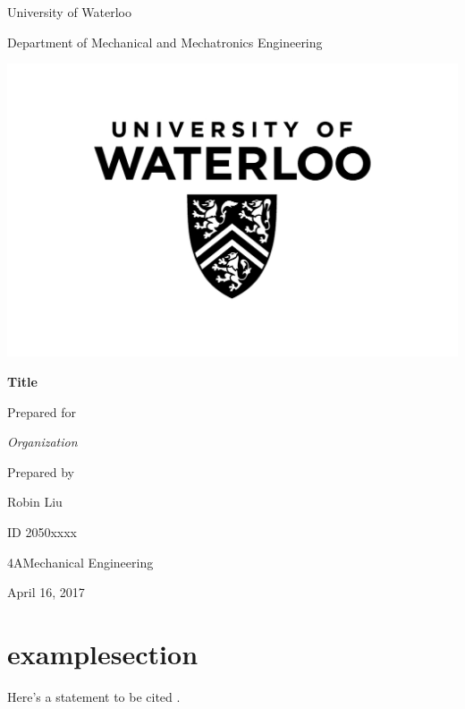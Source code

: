 \documentclass[12pt,letterpaper]{article}
\newcommand{\dateofsubmittal}{April 16, 2017}
\newcommand{\department}{Department of Mechanical and Mechatronics Engineering}
\newcommand{\yourname}{Robin Liu}
\newcommand{\youridnumber}{2050xxxx}
\newcommand{\academicterm}{4A}
\newcommand{\yourdiscipline}{Mechanical Engineering}
\begin{document}
  \begin{titlepage}
    \vspace*{\fill}
    \centering
    {
    {\large{University of Waterloo}

    \large{\department}

    }}
    \bigskip
    \includegraphics[width=0.3\paperwidth]{uwlogo.jpg}

    \bigskip\bigskip\bigskip
      \textbf{\huge{Title}}

    \bigskip\bigskip\bigskip
    \large{Prepared for}

      \bigskip
      {
      \textit{Organization}

      }
      \bigskip\bigskip
    \large{Prepared by}

      \bigskip
      {
      \yourname

      ID \youridnumber

      \academicterm\:\yourdiscipline

      }
      \dateofsubmittal{}

    \bigskip\bigskip
    \vspace*{\fill}
  \end{titlepage}
  \clearpage
  \tableofcontents{}\setcounter{page}{1}
  \clearpage
  \listoffigures
  \clearpage
  \listoftables
  \clearpage
  
  \clearpage
  \section{examplesection} %
    Here's a statement to be cited \cite{example}.
\end{document}
